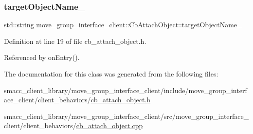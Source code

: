 \subsubsection{\texorpdfstring{target\+Object\+Name\+\_\+}{targetObjectName\_}}
{\footnotesize\ttfamily std\+::string move\+\_\+group\+\_\+interface\+\_\+client\+::\+Cb\+Attach\+Object\+::target\+Object\+Name\+\_\+}



Definition at line 19 of file cb\+\_\+attach\+\_\+object.\+h.



Referenced by on\+Entry().



The documentation for this class was generated from the following files\+:\begin{DoxyCompactItemize}
\item 
smacc\+\_\+client\+\_\+library/move\+\_\+group\+\_\+interface\+\_\+client/include/move\+\_\+group\+\_\+interface\+\_\+client/client\+\_\+behaviors/\hyperlink{cb__attach__object_8h}{cb\+\_\+attach\+\_\+object.\+h}\item 
smacc\+\_\+client\+\_\+library/move\+\_\+group\+\_\+interface\+\_\+client/src/move\+\_\+group\+\_\+interface\+\_\+client/client\+\_\+behaviors/\hyperlink{cb__attach__object_8cpp}{cb\+\_\+attach\+\_\+object.\+cpp}\end{DoxyCompactItemize}
